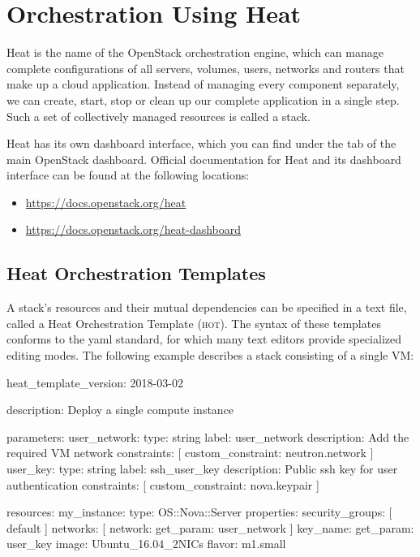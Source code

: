 \chapter{Orchestration Using Heat}\label{cha:orch-using-heat}
\gls{Heat} is the name of the OpenStack orchestration engine, which
can manage complete configurations of all servers, volumes, users,
networks and routers that make up a cloud application.  Instead of
managing every component separately, we can create, start, stop or
clean up our complete application in a single step.  Such a set of
collectively managed resources is called a \gls{stack}.

\gls{Heat} has its own dashboard interface, which you can find under
the  tab of the main OpenStack dashboard.  Official
documentation for Heat and its dashboard interface can be found at the
following locations:
\begin{itemize}
\item \url{https://docs.openstack.org/heat}
\item \url{https://docs.openstack.org/heat-dashboard}
\end{itemize}

\section{\gls{Heat Orchestration Template}s}\label{sec:glsh-orch-templ}
A \gls{stack}'s resources and their mutual dependencies can be
specified in a text file, called a \gls{Heat Orchestration Template}
(\textsc{hot}).  The syntax of these templates conforms to the
\gls{yaml} standard, for which many text editors provide specialized
editing modes.  The following example describes a stack consisting of
a single VM:
\begin{code}{}
heat_template_version: 2018-03-02

description: Deploy a single compute instance

parameters:
  user_network:
    type: string
    label: user_network
    description: Add the required VM network
    constraints: [ custom_constraint: neutron.network ]
  user_key:
    type: string
    label: ssh_user_key
    description: Public ssh key for user authentication
    constraints: [ custom_constraint: nova.keypair ]

resources:
  my_instance:
    type: OS::Nova::Server
    properties:
      security_groups: [ default ]
      networks: [ network: { get_param: user_network } ]
      key_name: { get_param: user_key }
      image: Ubuntu_16.04_2NICs
      flavor: m1.small
\end{code}

